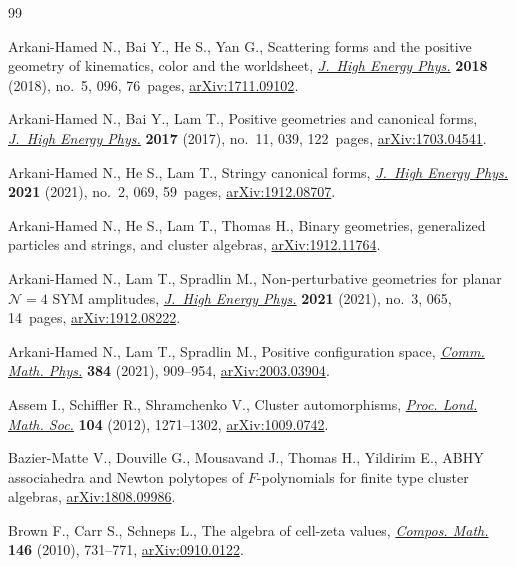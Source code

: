 \begin{thebibliography}{99}
\footnotesize\itemsep=0pt

Arkani-Hamed N., Bai Y., He S., Yan G., Scattering forms and the positive
 geometry of kinematics, color and the worldsheet, \href{https://doi.org/10.1007/jhep05(2018)096}{\textit{J.~High Energy
 Phys.}} \textbf{2018} (2018), no.~5, 096, 76~pages, \href{https://arxiv.org/abs/1711.09102}{arXiv:1711.09102}.

Arkani-Hamed N., Bai Y., Lam T., Positive geometries and canonical forms,
 \href{https://doi.org/10.1007/jhep11(2017)039}{\textit{J.~High Energy Phys.}} \textbf{2017} (2017), no.~11, 039, 122~pages,
 \href{https://arxiv.org/abs/1703.04541}{arXiv:1703.04541}.

Arkani-Hamed N., He S., Lam T., Stringy canonical forms, \href{https://doi.org/10.1007/jhep02(2021)069}{\textit{J.~High Energy
 Phys.}} \textbf{2021} (2021), no.~2, 069, 59~pages, \href{https://arxiv.org/abs/1912.08707}{arXiv:1912.08707}.

Arkani-Hamed N., He S., Lam T., Thomas H., Binary geometries, generalized
 particles and strings, and cluster algebras, \href{https://arxiv.org/abs/1912.11764}{arXiv:1912.11764}.

Arkani-Hamed N., Lam T., Spradlin M., Non-perturbative geometries for planar
 {${\mathcal N} = 4$} {SYM} amplitudes, \href{https://doi.org/10.1007/jhep03(2021)065}{\textit{J.~High Energy Phys.}}
 \textbf{2021} (2021), no.~3, 065, 14~pages, \href{https://arxiv.org/abs/1912.08222}{arXiv:1912.08222}.

Arkani-Hamed N., Lam T., Spradlin M., Positive configuration space,
 \href{https://doi.org/10.1007/s00220-021-04041-x}{\textit{Comm. Math. Phys.}} \textbf{384} (2021), 909--954,
 \href{https://arxiv.org/abs/2003.03904}{arXiv:2003.03904}.

Assem I., Schiffler R., Shramchenko V., Cluster automorphisms, \href{https://doi.org/10.1112/plms/pdr049}{\textit{Proc.
 Lond. Math. Soc.}} \textbf{104} (2012), 1271--1302, \href{https://arxiv.org/abs/1009.0742}{arXiv:1009.0742}.

Bazier-Matte V., Douville G., Mousavand J., Thomas H., Yildirim E., {ABHY}
 associahedra and {N}ewton polytopes of {$F$}-polynomials for finite type
 cluster algebras, \href{https://arxiv.org/abs/1808.09986}{arXiv:1808.09986}.

Brown F., Carr S., Schneps L., The algebra of cell-zeta values, \href{https://doi.org/10.1112/S0010437X09004540}{\textit{Compos.
 Math.}} \textbf{146} (2010), 731--771, \href{https://arxiv.org/abs/0910.0122}{arXiv:0910.0122}.


\end{thebibliography}
